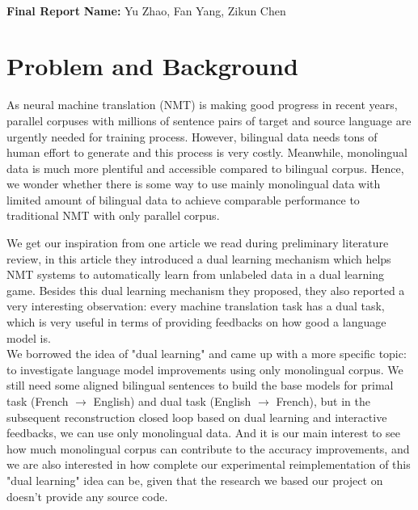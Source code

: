 \documentclass[11pt]{article}
\begin{document}
\\
{{\bf Final Report} \hfill {{\bf Name:} Yu Zhao, Fan Yang, Zikun Chen} \\
\part{Problem and Background}
As neural machine translation (NMT) is making good progress in recent years, parallel corpuses with millions of sentence pairs of target and source language are urgently needed for training process. However, bilingual data needs tons of human effort to generate and this process is very costly. Meanwhile, monolingual data is much more plentiful and accessible compared to bilingual corpus. Hence, we wonder whether there is some way to use mainly monolingual data with limited amount of bilingual data to achieve comparable performance to traditional NMT with only parallel corpus.
\newline

We get our inspiration from one article\cite{he2016dual} we read during preliminary literature review, in this article they introduced a dual learning mechanism which helps NMT systems to automatically learn from unlabeled data in a dual learning game. Besides this dual learning mechanism they proposed, they also reported a very interesting observation: every machine translation task has a dual task, which is very useful in terms of providing feedbacks on how good a language model is.
\\
\newline
\indent We borrowed the idea of "dual learning" and came up with a more specific topic: to investigate language model improvements using only monolingual corpus. We still need some aligned bilingual sentences to build the base models for primal task (French $\to$ English) and dual task (English $\to$ French), but in the subsequent reconstruction closed loop based on dual learning and interactive feedbacks, we can use only monolingual data. And it is our main interest to see how much monolingual corpus can contribute to the accuracy improvements, and we are also interested in how complete our experimental reimplementation of this "dual learning" idea can be, given that the research we based our project on doesn't provide any source code.

}
\end{document}
